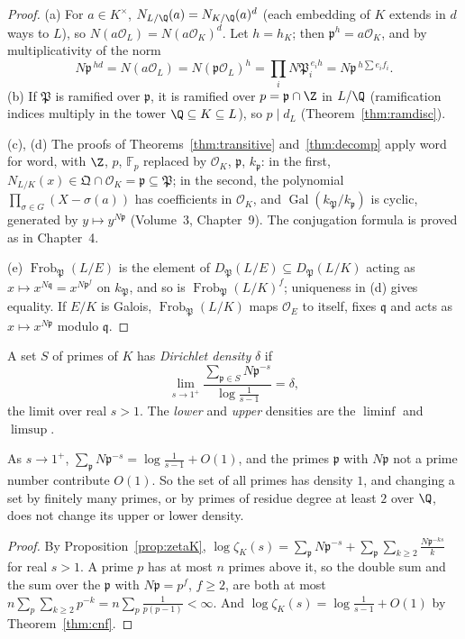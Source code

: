 \begin{proof}
(a) For $a\in K^\times$, $N_{L/\Q}(a)=N_{K/\Q}(a)^d$ (each embedding of $K$ extends in $d$ ways to $L$), so $N(a\mathcal O_L)=N(a\mathcal O_K)^d$.
Let $h=h_K$; then $\mathfrak p^h=a\mathcal O_K$, and by multiplicativity of the norm
\[
N\mathfrak p^{\,hd}=N(a\mathcal O_L)=N(\mathfrak p\mathcal O_L)^h=\prod_iN\mathfrak P_i^{\,e_ih}=N\mathfrak p^{\,h\sum e_if_i}.
\]
(b) If $\mathfrak P$ is ramified over $\mathfrak p$, it is ramified over $p=\mathfrak p\cap\Z$ in $L/\Q$ (ramification indices multiply in
the tower $\Q\subseteq K\subseteq L$), so $p\mid d_L$ (Theorem~\ref{thm:ramdisc}).

(c), (d) The proofs of Theorems~\ref{thm:transitive} and~\ref{thm:decomp} apply word for word, with $\Z$, $p$, $\mathbb F_p$ replaced by
$\mathcal O_K$, $\mathfrak p$, $k_{\mathfrak p}$: in the first, $N_{L/K}(x)\in\mathfrak Q\cap\mathcal O_K=\mathfrak p\subseteq\mathfrak P$; in
the second, the polynomial $\prod_{\sigma\in G}(X-\sigma(a))$ has coefficients in $\mathcal O_K$, and $\operatorname{Gal}(k_{\mathfrak
P}/k_{\mathfrak p})$ is cyclic, generated by $y\mapsto y^{N\mathfrak p}$ (Volume~3, Chapter~9). The conjugation formula is proved as in
Chapter~4.

(e) $\operatorname{Frob}_{\mathfrak P}(L/E)$ is the element of $D_{\mathfrak P}(L/E)\subseteq D_{\mathfrak P}(L/K)$ acting as $x\mapsto
x^{N\mathfrak q}=x^{N\mathfrak p^f}$ on $k_{\mathfrak P}$, and so is $\operatorname{Frob}_{\mathfrak P}(L/K)^f$; uniqueness in (d) gives equality.
If $E/K$ is Galois, $\operatorname{Frob}_{\mathfrak P}(L/K)$ maps $\mathcal O_E$ to itself, fixes $\mathfrak q$ and acts as $x\mapsto
x^{N\mathfrak p}$ modulo $\mathfrak q$.
\end{proof}

\begin{definition}
A set $S$ of primes of $K$ has \emph{Dirichlet density} $\delta$ if
\[
\lim_{s\to1^+}\frac{\sum_{\mathfrak p\in S}N\mathfrak p^{-s}}{\log\frac1{s-1}}=\delta ,
\]
the limit over real $s>1$. The \emph{lower} and \emph{upper} densities are the $\liminf$ and $\limsup$.
\end{definition}

\begin{proposition}\label{prop:primesum}
As $s\to1^+$, $\sum_{\mathfrak p}N\mathfrak p^{-s}=\log\frac1{s-1}+O(1)$, and the primes $\mathfrak p$ with $N\mathfrak p$ not a prime number
contribute $O(1)$. So the set of all primes has density $1$, and changing a set by finitely many primes, or by primes of residue degree at
least $2$ over $\Q$, does not change its upper or lower density.
\end{proposition}
\begin{proof}
By Proposition~\ref{prop:zetaK}, $\log\zeta_K(s)=\sum_{\mathfrak p}N\mathfrak p^{-s}+\sum_{\mathfrak p}\sum_{k\ge2}\frac{N\mathfrak p^{-ks}}k$ for
real $s>1$. A prime $p$ has at most $n$ primes above it, so the double sum and the sum over the $\mathfrak p$ with $N\mathfrak p=p^f$, $f\ge2$,
are both at most $n\sum_p\sum_{k\ge2}p^{-k}=n\sum_p\frac1{p(p-1)}<\infty$. And $\log\zeta_K(s)=\log\frac1{s-1}+O(1)$ by
Theorem~\ref{thm:cnf}.
\end{proof}

